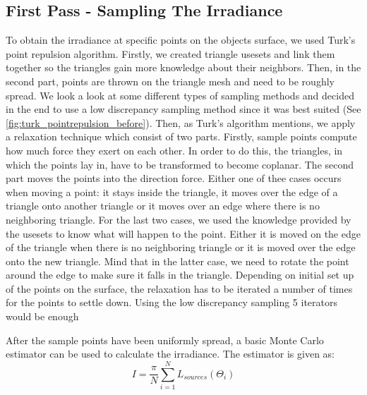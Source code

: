 \documentclass{article}
\begin{document}
\subsection{First Pass - Sampling The Irradiance}
To obtain the irradiance at specific points on the objects surface, we used Turk's point repulsion algorithm. Firstly, we created triangle usesets and link them together so the triangles gain more knowledge about their neighbors. Then, in the second part, points are thrown on the triangle mesh and need to be roughly spread. We look a look at some different types of sampling methods and decided in the end to use a low discrepancy sampling method since it was best suited (See \ref{fig:turk_pointrepulsion_before}). Then, as Turk's algorithm mentions, we apply a relaxation technique which consist of two parts. Firstly, sample points compute how much force they exert on each other. In order to do this, the triangles, in which the points lay in, have to be transformed to become coplanar. The second part moves the points into the direction force. Either one of thee cases occurs when moving a point: it stays inside the triangle, it moves over the edge of a triangle onto another triangle or it moves over an edge where there is no neighboring triangle. For the last two cases, we used the knowledge provided by the usesets  to know what will happen to the point. Either it is moved on the edge of the triangle when there is no neighboring triangle or it is moved over the edge onto the new triangle. Mind that in the latter case, we need to rotate the point around the edge to make sure it falls in the triangle. Depending on initial set up of the points on the surface, the relaxation has to be iterated a number of times for the points to settle down. Using the low discrepancy sampling 5 iterators would be enough %

After the sample points have been uniformly spread, a basic Monte Carlo estimator can be used to calculate the irradiance. The estimator is given as:
\begin{equation}
I =  \frac{ \pi }{N } \sum_{i=1}^{ N}L_{sources} \left (  \Theta_i  \right )
\end{equation}
\end{document}
